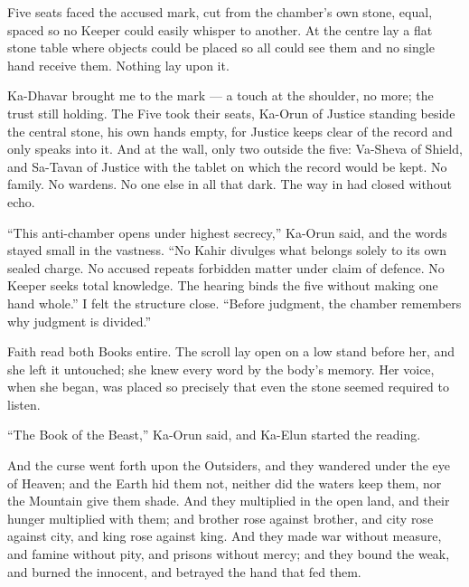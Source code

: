 Five seats faced the accused mark, cut from the chamber's own stone, equal, spaced so no Keeper could easily whisper to another. At the centre lay a flat stone table where objects could be placed so all could see them and no single hand receive them. Nothing lay upon it.\par
 
Ka-Dhavar brought me to the mark --- a touch at the shoulder, no more; the trust still holding. The Five took their seats, Ka-Orun of Justice standing beside the central stone, his own hands empty, for Justice keeps clear of the record and only speaks into it. And at the wall, only two outside the five: Va-Sheva of Shield, and Sa-Tavan of Justice with the tablet on which the record would be kept. No family. No wardens. No one else in all that dark. The way in had closed without echo.\par
 
``This anti-chamber opens under highest secrecy,'' Ka-Orun said, and the words stayed small in the vastness. ``No Kahir divulges what belongs solely to its own sealed charge. No accused repeats forbidden matter under claim of defence. No Keeper seeks total knowledge. The hearing binds the five without making one hand whole.'' I felt the structure close. ``Before judgment, the chamber remembers why judgment is divided.''\par
 
Faith read both Books entire. The scroll lay open on a low stand before her, and she left it untouched; she knew every word by the body's memory. Her voice, when she began, was placed so precisely that even the stone seemed required to listen.\par
 
``The Book of the Beast,'' Ka-Orun said, and Ka-Elun started the reading.\par
 
\begin{scripture}
And the curse went forth upon the Outsiders, and they wandered under the eye of Heaven; and the Earth hid them not, neither did the waters keep them, nor the Mountain give them shade.
And they multiplied in the open land, and their hunger multiplied with them; and brother rose against brother, and city rose against city, and king rose against king.
And they made war without measure, and famine without pity, and prisons without mercy; and they bound the weak, and burned the innocent, and betrayed the hand that fed them.
\end{scripture}
 
